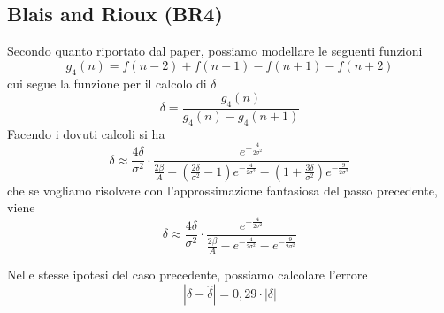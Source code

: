 \subsection*{Blais and Rioux (BR4)}
Secondo quanto riportato dal paper, possiamo modellare le seguenti funzioni
\begin{equation*}
  g_4(n) = f(n-2) + f(n-1) - f(n+1) - f(n+2)
\end{equation*}
cui segue la funzione per il calcolo di $\delta$
\begin{equation*}
  \delta = \frac{g_4(n)}{g_4(n) - g_4(n+1)}
\end{equation*}
Facendo i dovuti calcoli si ha
\begin{equation}
\delta \approx \frac{4\delta}{\sigma^2} \cdot \frac{
    e^{-\frac{4}{2\sigma^2}}
  }{
    \frac{2\beta}{A} + 
    \left(\frac{2\delta}{\sigma^2}-1\right)e^{-\frac{4}{2\sigma^2}} -
    \left(1+\frac{3\delta}{\sigma^2}\right)e^{-\frac{9}{2\sigma^2}}
  }
\end{equation}
che se vogliamo risolvere con l'approssimazione fantasiosa del passo precedente, viene
\begin{equation}
\delta \approx \frac{4\delta}{\sigma^2} \cdot \frac{
    e^{-\frac{4}{2\sigma^2}}
  }{
    \frac{2\beta}{A} -
    e^{-\frac{4}{2\sigma^2}} -
    e^{-\frac{9}{2\sigma^2}}
  }
\end{equation}

\noindent
Nelle stesse ipotesi del caso precedente, possiamo calcolare l'errore
\begin{equation}
|\delta - \hat{\delta}| = 0,29 \cdot |\delta|
\end{equation}
